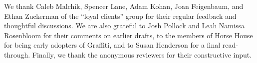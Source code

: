 We thank Caleb Malchik, Spencer Lane, Adam Kohan,
Joan Feigenbaum, and Ethan Zuckerman of the ``loyal clients'' group
for their regular feedback and thoughtful discussions.
We are also grateful to Josh Pollock and Leah Namissa Rosenbloom for their
comments on earlier drafts, to the members of Horse House
for being early adopters of Graffiti,
and to Susan Henderson for a final read-through.
Finally, we thank the anonymous reviewers for their constructive input.

